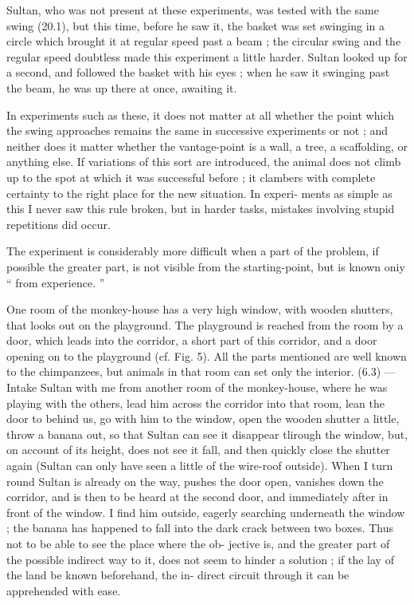 \documentclass{article}
\begin{document}
Sultan, who was not present at these experiments, was
tested with the same swing (20.1), but this time, before
he saw it, the basket was set swinging in a circle which brought
it at regular speed past a beam ; the circular swing and
the regular speed doubtless made this experiment a little
harder. Sultan looked up for a second, and followed the
basket with his eyes ; when he saw it swinging past the
beam, he was up there at once, awaiting it.

In experiments such as these, it does not matter at all
whether the point which the swing approaches remains
the same in successive experiments or not ; and neither
does it matter whether the vantage-point is a wall, a tree,
a scaffolding, or anything else. If variations of this sort
are introduced, the animal does not climb up to the spot
at which it was successful before ; it clambers with complete
certainty to the right place for the new situation. In experi-
ments as simple as this I never saw this rule broken, but in
harder tasks, mistakes involving stupid repetitions did occur.

The experiment is considerably more difficult when a
part of the problem, if possible the greater part, is not visible
from the starting-point, but is known oniy “ from experience. ”

One room of the monkey-house has a very high window,
with wooden shutters, that looks out on the playground.
The playground is reached from the room by a door, which
leads into the corridor, a short part of this corridor, and a
door opening on to the playground (cf. Fig. 5). All the
parts mentioned are well known to the chimpanzees, but
animals in that room can set only the interior. (6.3) —
Intake Sultan with me from another room of the monkey-house,
where he was playing with the others, lead him across the
corridor into that room, lean the door to behind us, go with
him to the window, open the wooden shutter a little, throw
a banana out, so that Sultan can see it disappear tlirough
the window, but, on account of its height, does not see it fall,
and then quickly close the shutter again (Sultan can only
have seen a little of the wire-roof outside). When I turn
round Sultan is already on the way, pushes the door open,
vanishes down the corridor, and is then to be heard at the
second door, and immediately after in front of the window.
I find him outside, eagerly searching underneath the window ;
the banana has happened to fall into the dark crack between
two boxes. Thus not to be able
to see the place where the ob-
jective is, and the greater part
of the possible indirect way to
it, does not seem to hinder a
solution ; if the lay of the land
be known beforehand, the in-
direct circuit through it can be
apprehended with ease.
\end{document}
